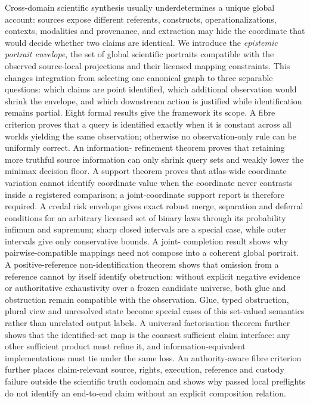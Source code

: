 Cross-domain scientific synthesis usually underdetermines a unique global
account: sources expose different referents, constructs, operationalizations,
contexts, modalities and provenance, and extraction may hide the coordinate
that would decide whether two claims are identical. We introduce the
\emph{epistemic portrait envelope}, the set of global scientific portraits
compatible with the observed source-local projections and their licensed
mapping constraints. This changes integration from selecting one canonical
graph to three separable questions: which claims are point identified, which
additional observation would shrink the envelope, and which downstream action
is justified while identification remains partial. Eight formal results give
the framework its scope. A fibre criterion proves that a query is identified
exactly when it is constant across all worlds yielding the same observation;
otherwise no observation-only rule can be uniformly correct. An information-
refinement theorem proves that retaining more truthful source information can
only shrink query sets and weakly lower the minimax decision floor. A support
theorem proves that atlas-wide coordinate variation cannot identify
coordinate value when the coordinate never contrasts inside a registered
comparison; a joint-coordinate support report is therefore required. A credal
risk envelope gives exact robust merge, separation and deferral conditions for
an arbitrary licensed set of binary laws through its probability infimum and
supremum; sharp closed intervals are a special case, while outer intervals give
only conservative bounds. A joint-
completion result shows why pairwise-compatible mappings need not compose into
a coherent global portrait. A positive-reference non-identification theorem
shows that omission from a reference cannot by itself identify obstruction:
without explicit negative evidence or authoritative exhaustivity over a frozen
candidate universe, both glue and obstruction remain compatible with the
observation. Glue, typed obstruction, plural view and
unresolved state become special cases of this set-valued semantics rather than
unrelated output labels. A universal factorisation theorem further shows that
the identified-set map is the coarsest sufficient claim interface: any other
sufficient product must refine it, and information-equivalent implementations
must tie under the same loss. An authority-aware fibre criterion further
places claim-relevant source, rights, execution, reference and custody
failure outside the scientific truth codomain and shows why passed local
preflights do not identify an end-to-end claim without an explicit
composition relation.

